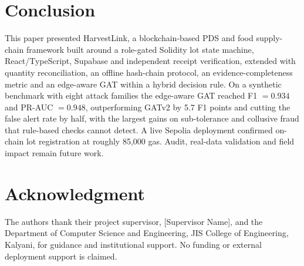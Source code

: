 \documentclass[conference,a4paper]{IEEEtran}
\begin{document}
\section{Conclusion}
This paper presented HarvestLink, a blockchain-based PDS and food supply-chain framework built around a role-gated Solidity lot state machine, React/TypeScript, Supabase and independent receipt verification, extended with quantity reconciliation, an offline hash-chain protocol, an evidence-completeness metric and an edge-aware GAT within a hybrid decision rule. On a synthetic benchmark with eight attack families the edge-aware GAT reached F1 $=0.934$ and PR-AUC $=0.948$, outperforming GATv2 by 5.7 F1 points and cutting the false alert rate by half, with the largest gains on sub-tolerance and collusive fraud that rule-based checks cannot detect. A live Sepolia deployment confirmed on-chain lot registration at roughly 85{,}000 gas. Audit, real-data validation and field impact remain future work.

\section*{Acknowledgment}
The authors thank their project supervisor, [Supervisor Name], and the Department of Computer Science and Engineering, JIS College of Engineering, Kalyani, for guidance and institutional support. No funding or external deployment support is claimed.
\end{document}
